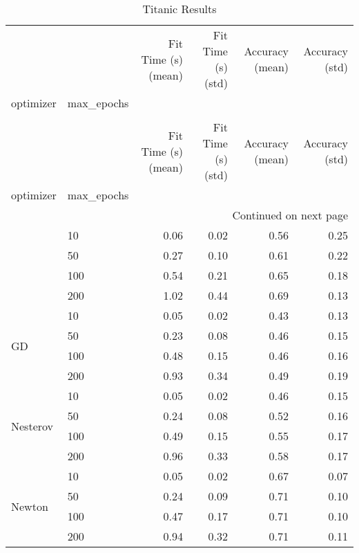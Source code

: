 \begin{longtable}{llrrrr}
\caption{Titanic Results} \label{tab:titanic_results} \\
\toprule
 &  & Fit Time (s) (mean) & Fit Time (s) (std) & Accuracy (mean) & Accuracy (std) \\
optimizer & max_epochs &  &  &  &  \\
\midrule
\endfirsthead
\caption[]{Titanic Results} \\
\toprule
 &  & Fit Time (s) (mean) & Fit Time (s) (std) & Accuracy (mean) & Accuracy (std) \\
optimizer & max_epochs &  &  &  &  \\
\midrule
\endhead
\midrule
\multicolumn{6}{r}{Continued on next page} \\
\midrule
\endfoot
\bottomrule
\endlastfoot
\multirow[t]{4}{*}{Adam} & 10 & 0.06 & 0.02 & 0.56 & 0.25 \\
 & 50 & 0.27 & 0.10 & 0.61 & 0.22 \\
 & 100 & 0.54 & 0.21 & 0.65 & 0.18 \\
 & 200 & 1.02 & 0.44 & 0.69 & 0.13 \\
\cline{1-6}
\multirow[t]{4}{*}{GD} & 10 & 0.05 & 0.02 & 0.43 & 0.13 \\
 & 50 & 0.23 & 0.08 & 0.46 & 0.15 \\
 & 100 & 0.48 & 0.15 & 0.46 & 0.16 \\
 & 200 & 0.93 & 0.34 & 0.49 & 0.19 \\
\cline{1-6}
\multirow[t]{4}{*}{Nesterov} & 10 & 0.05 & 0.02 & 0.46 & 0.15 \\
 & 50 & 0.24 & 0.08 & 0.52 & 0.16 \\
 & 100 & 0.49 & 0.15 & 0.55 & 0.17 \\
 & 200 & 0.96 & 0.33 & 0.58 & 0.17 \\
\cline{1-6}
\multirow[t]{4}{*}{Newton} & 10 & 0.05 & 0.02 & 0.67 & 0.07 \\
 & 50 & 0.24 & 0.09 & 0.71 & 0.10 \\
 & 100 & 0.47 & 0.17 & 0.71 & 0.10 \\
 & 200 & 0.94 & 0.32 & 0.71 & 0.11 \\
\cline{1-6}
\end{longtable}
